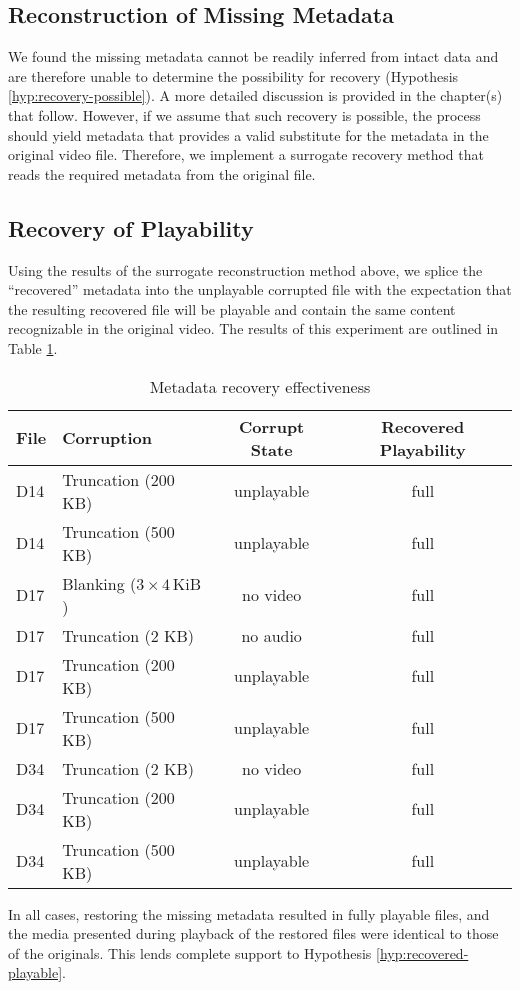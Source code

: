 \subsection{Reconstruction of Missing Metadata}

We found the missing metadata cannot be readily inferred from intact data and are therefore unable to determine the possibility for recovery (Hypothesis \ref{hyp:recovery-possible}). A more detailed discussion is provided in the chapter(s) that follow. However, if we assume that such recovery is possible, the process should yield metadata that provides a valid substitute for the metadata in the original video file. Therefore, we implement a surrogate recovery method that reads the required metadata from the original file.

\subsection{Recovery of Playability}

Using the results of the surrogate reconstruction method above, we splice the ``recovered'' metadata into the unplayable corrupted file with the expectation that the resulting recovered file will be playable and contain the same content recognizable in the original video. The results of this experiment are outlined in Table \ref{tab:recovery-results}.

\begin{table}
    \centering
    \begin{tabular}{|l|l||c||c|}
        \hline
        \textbf{File} & \textbf{Corruption} & \textbf{Corrupt State} & \textbf{Recovered Playability} \\
        \hline \hline
        D14 & Truncation (200 KB) & unplayable & full \\
        D14 & Truncation (500 KB) & unplayable & full \\
        \hline
        D17 & Blanking ($3\times 4\,\mathrm{KiB}$) & no video & full \\
        D17 & Truncation (2 KB) & no audio & full \\
        D17 & Truncation (200 KB) & unplayable & full \\
        D17 & Truncation (500 KB) & unplayable & full \\
        \hline
        D34 & Truncation (2 KB) & no video & full \\
        D34 & Truncation (200 KB) & unplayable & full \\
        D34 & Truncation (500 KB) & unplayable & full \\
        \hline
    \end{tabular}
    \caption{Metadata recovery effectiveness}
    \label{tab:recovery-results}
\end{table}

In all cases, restoring the missing metadata resulted in fully playable files, and the media presented during playback of the restored files were identical to those of the originals. This lends complete support to Hypothesis \ref{hyp:recovered-playable}.